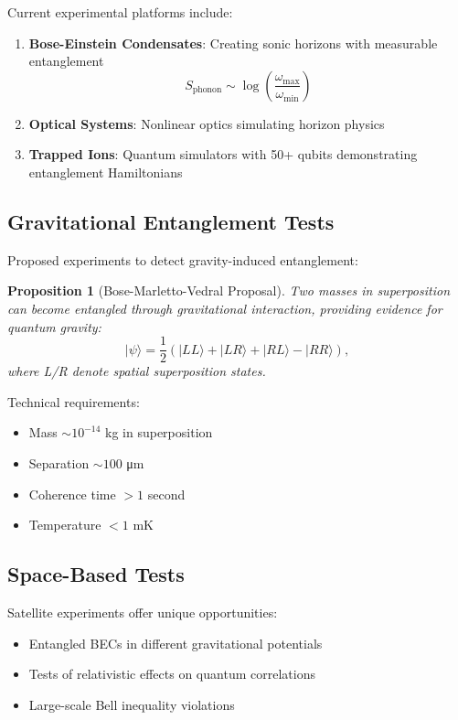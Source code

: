 \documentclass[11pt,letterpaper]{article}
\newtheorem{proposition}[theorem]{Proposition}
\begin{document}
Current experimental platforms include:

\begin{enumerate}
\item \textbf{Bose-Einstein Condensates}: Creating sonic horizons with measurable entanglement
\begin{equation}
S_{\text{phonon}} \sim \log\left(\frac{\omega_{\text{max}}}{\omega_{\text{min}}}\right)
\end{equation}

\item \textbf{Optical Systems}: Nonlinear optics simulating horizon physics
\item \textbf{Trapped Ions}: Quantum simulators with 50+ qubits demonstrating entanglement Hamiltonians
\end{enumerate}

\subsection{Gravitational Entanglement Tests}

Proposed experiments to detect gravity-induced entanglement:

\begin{proposition}[Bose-Marletto-Vedral Proposal]
Two masses in superposition can become entangled through gravitational interaction, providing evidence for quantum gravity:
\begin{equation}
|\psi\rangle = \frac{1}{2}(|LL\rangle + |LR\rangle + |RL\rangle - |RR\rangle),
\end{equation}
where L/R denote spatial superposition states.
\end{proposition}

Technical requirements:
\begin{itemize}
\item Mass $\sim 10^{-14}$ kg in superposition
\item Separation $\sim 100$ μm
\item Coherence time $> 1$ second
\item Temperature $< 1$ mK
\end{itemize}

\subsection{Space-Based Tests}

Satellite experiments offer unique opportunities:
\begin{itemize}
\item Entangled BECs in different gravitational potentials
\item Tests of relativistic effects on quantum correlations
\item Large-scale Bell inequality violations
\end{itemize}
\end{document}
